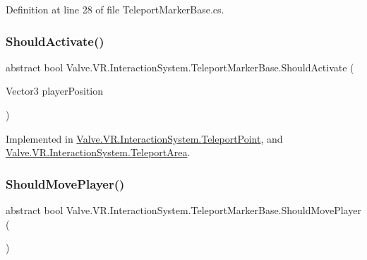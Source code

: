 Definition at line 28 of file Teleport\+Marker\+Base.\+cs.

\mbox{\label{class_valve_1_1_v_r_1_1_interaction_system_1_1_teleport_marker_base_a8c5bd9c4fad8bbfcd4cca509bd76e375}} 
\subsubsection{\texorpdfstring{ShouldActivate()}{ShouldActivate()}}
{\footnotesize\ttfamily abstract bool Valve.\+V\+R.\+Interaction\+System.\+Teleport\+Marker\+Base.\+Should\+Activate (\begin{DoxyParamCaption}\item[{Vector3}]{player\+Position }\end{DoxyParamCaption})\hspace{0.3cm}{\ttfamily [pure virtual]}}



Implemented in \mbox{\hyperlink{class_valve_1_1_v_r_1_1_interaction_system_1_1_teleport_point_a3a5e0dae80f7d66fbffce006b3c0ab72}{Valve.\+V\+R.\+Interaction\+System.\+Teleport\+Point}}, and \mbox{\hyperlink{class_valve_1_1_v_r_1_1_interaction_system_1_1_teleport_area_ad9af038ae8e61a6494ce9dc42f902395}{Valve.\+V\+R.\+Interaction\+System.\+Teleport\+Area}}.

\mbox{\label{class_valve_1_1_v_r_1_1_interaction_system_1_1_teleport_marker_base_ae58e1036576aa8b913ad958bd294cd6f}} 
\subsubsection{\texorpdfstring{ShouldMovePlayer()}{ShouldMovePlayer()}}
{\footnotesize\ttfamily abstract bool Valve.\+V\+R.\+Interaction\+System.\+Teleport\+Marker\+Base.\+Should\+Move\+Player (\begin{DoxyParamCaption}{ }\end{DoxyParamCaption})\hspace{0.3cm}{\ttfamily [pure virtual]}}



